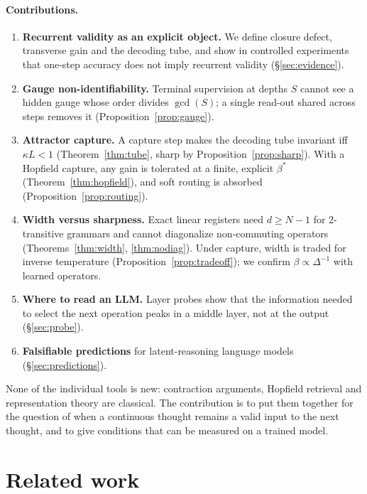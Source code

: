\documentclass[11pt]{article}
\theoremstyle{definition}
\theoremstyle{remark}
\begin{document}
\paragraph{Contributions.}
\begin{enumerate}[leftmargin=*,itemsep=2pt]
\item \textbf{Recurrent validity as an explicit object.} We define closure defect, transverse
gain and the decoding tube, and show in controlled experiments that one-step accuracy does not
imply recurrent validity (\S\ref{sec:evidence}).
\item \textbf{Gauge non-identifiability.} Terminal supervision at depths $S$ cannot see a hidden
gauge whose order divides $\gcd(S)$; a single read-out shared across steps removes it
(Proposition~\ref{prop:gauge}).
\item \textbf{Attractor capture.} A capture step makes the decoding tube invariant iff
$\kappa L<1$ (Theorem~\ref{thm:tube}, sharp by Proposition~\ref{prop:sharp}). With a Hopfield
capture, any gain is tolerated at a finite, explicit $\beta^*$ (Theorem~\ref{thm:hopfield}), and
soft routing is absorbed (Proposition~\ref{prop:routing}).
\item \textbf{Width versus sharpness.} Exact linear registers need $d\ge N-1$ for 2-transitive
grammars and cannot diagonalize non-commuting operators (Theorems~\ref{thm:width},
\ref{thm:nodiag}). Under capture, width is traded for inverse temperature
(Proposition~\ref{prop:tradeoff}); we confirm $\beta\propto\Delta^{-1}$ with learned operators.
\item \textbf{Where to read an LLM.} Layer probes show that the information needed to select the
next operation peaks in a middle layer, not at the output (\S\ref{sec:probe}).
\item \textbf{Falsifiable predictions} for latent-reasoning language models (\S\ref{sec:predictions}).
\end{enumerate}

None of the individual tools is new: contraction arguments, Hopfield retrieval and
representation theory are classical. The contribution is to put them together for the question
of when a continuous thought remains a valid input to the next thought, and to give conditions
that can be measured on a trained model.

\section{Related work}
\end{document}
